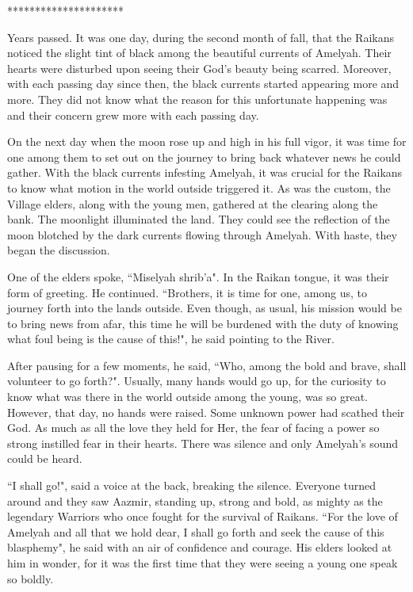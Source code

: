\documentclass[twoside,11pt,titlepage]{article}
\begin{document}
\bigskip
\begin{center}
*********************
\end{center}

Years passed. It was one day, during the second month of fall, that the Raikans noticed the slight tint of black among the beautiful currents of Amelyah. Their hearts were disturbed upon seeing their God's beauty being scarred. Moreover, with each passing day since then, the black currents started appearing more and more. They did not know what the reason for this unfortunate happening was and their concern grew more with each passing day.

On the next day when the moon rose up and high in his full vigor, it was time for one among them to set out on the journey to bring back whatever news he could gather. With the black currents infesting Amelyah, it was crucial for the Raikans to know what motion in the world outside triggered it. As was the custom, the Village elders, along with the young men, gathered at the clearing along the bank. The moonlight illuminated the land. They could see the reflection of the moon blotched by the dark currents flowing through Amelyah. With haste, they began the discussion.

One of the elders spoke, ``Miselyah shrib'a". In the Raikan tongue, it was their form of greeting. He continued. ``Brothers, it is time for one, among us, to journey forth into the lands outside. Even though, as usual, his mission would be to bring news from afar, this time he will be burdened with the duty of knowing what foul being is the cause of this!", he said pointing to the River.

After pausing for a few moments, he said, ``Who, among the bold and brave, shall volunteer to go forth?". Usually, many hands would go up, for the curiosity to know what was there in the world outside among the young, was so great. However, that day, no hands were raised. Some unknown power had scathed their God. As much as all the love they held for Her, the fear of facing a power so strong instilled fear in their hearts. There was silence and only Amelyah's sound could be heard.

``I shall go!", said a voice at the back, breaking the silence. Everyone turned around and they saw Aazmir, standing up, strong and bold, as mighty as the legendary Warriors who once fought for the survival of Raikans. ``For the love of Amelyah and all that we hold dear, I shall go forth and seek the cause of this blasphemy", he said with an air of confidence and courage. His elders looked at him in wonder, for it was the first time that they were seeing a young one speak so boldly.
\end{document}
